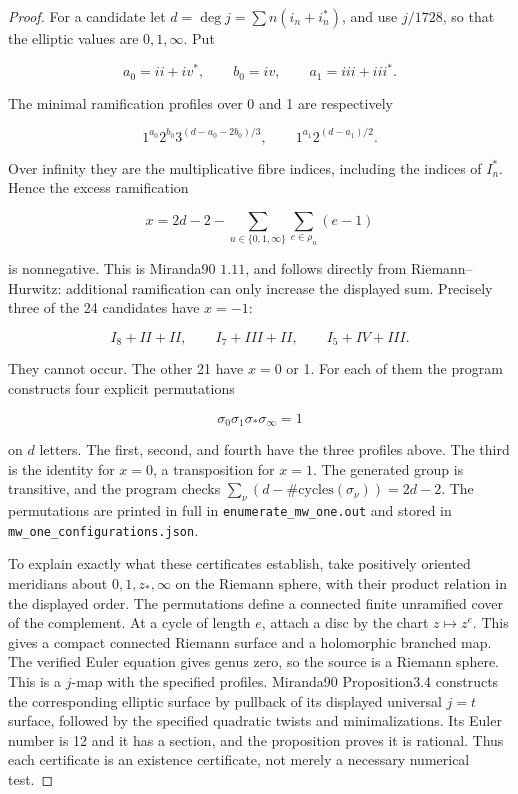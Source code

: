 \begin{proof}
For a candidate let \(d=\deg j=\sum n(i_n+i_n^*)\), and use \(j/1728\), so that the elliptic values are \(0,1,\infty\). Put

\[
 a_0=ii+iv^*,\qquad b_0=iv,
 \qquad a_1=iii+iii^*.
\]

The minimal ramification profiles over 0 and 1 are respectively

\[
 1^{a_0}2^{b_0}3^{(d-a_0-2b_0)/3},\qquad
 1^{a_1}2^{(d-a_1)/2}.
\]

Over infinity they are the multiplicative fibre indices, including the indices of \(I_n^*\). Hence the excess ramification

\[
 x=2d-2-\sum_{u\in\{0,1,\infty\}}\sum_{e\in\rho_u}(e-1)
\]

is nonnegative. This is Miranda90 \(1.11\), and follows directly from Riemann--Hurwitz: additional ramification can only increase the displayed sum. Precisely three of the 24 candidates have \(x=-1\):

\[
 I_8+II+II,\qquad I_7+III+II,\qquad I_5+IV+III.
\]

They cannot occur. The other 21 have \(x=0\) or 1. For each of them the program constructs four explicit permutations

\[
 \sigma_0\sigma_1\sigma_*\sigma_\infty=1
\]

on \(d\) letters. The first, second, and fourth have the three profiles above. The third is the identity for \(x=0\), a transposition for \(x=1\). The generated group is transitive, and the program checks \(\sum_\nu(d-\#\mathrm{cycles}(\sigma_\nu))=2d-2\). The permutations are printed in full in \texttt{enumerate\_mw\_one.out} and stored in \texttt{mw\_one\_configurations.json}.

To explain exactly what these certificates establish, take positively oriented meridians about \(0,1,z_*,\infty\) on the Riemann sphere, with their product relation in the displayed order. The permutations define a connected finite unramified cover of the complement. At a cycle of length \(e\), attach a disc by the chart \(z\mapsto z^e\). This gives a compact connected Riemann surface and a holomorphic branched map. The verified Euler equation gives genus zero, so the source is a Riemann sphere. This is a \(j\)-map with the specified profiles. Miranda90 Proposition3.4 constructs the corresponding elliptic surface by pullback of its displayed universal \(j=t\) surface, followed by the specified quadratic twists and minimalizations. Its Euler number is 12 and it has a section, and the proposition proves it is rational. Thus each certificate is an existence certificate, not merely a necessary numerical test.


\end{proof}
